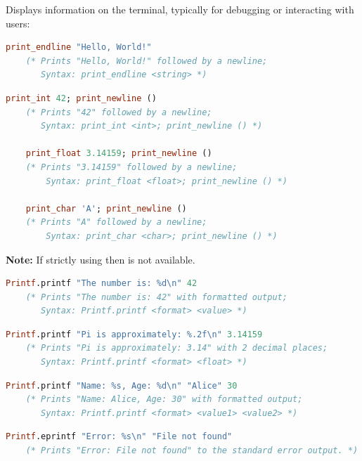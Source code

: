 \newpage
\begin{Def}

    Displays information on the terminal, typically for debugging or interacting with users:
    
    \begin{lstlisting}[language=OCaml, caption={Printing a String}, numbers=none]
    print_endline "Hello, World!"
    (* Prints "Hello, World!" followed by a newline;
       Syntax: print_endline <string> *)
    \end{lstlisting}
    
    \begin{lstlisting}[language=OCaml, caption={Printing Integers, Floats, and Characters}, numbers=none]
    print_int 42; print_newline ()
    (* Prints "42" followed by a newline;
       Syntax: print_int <int>; print_newline () *)
    
    print_float 3.14159; print_newline ()
    (* Prints "3.14159" followed by a newline;
        Syntax: print_float <float>; print_newline () *)

    print_char 'A'; print_newline ()
    (* Prints "A" followed by a newline;
        Syntax: print_char <char>; print_newline () *)
    \end{lstlisting}
    
    \textbf{Note:} If strictly using  then  is not available.
    \begin{lstlisting}[language=OCaml, caption={Formatted Printing with Printf}, numbers=none]
    Printf.printf "The number is: %d\n" 42
    (* Prints "The number is: 42" with formatted output;
       Syntax: Printf.printf <format> <value> *)
    \end{lstlisting}
    
    \begin{lstlisting}[language=OCaml, caption={Formatted Printing for Floats}, numbers=none]
    Printf.printf "Pi is approximately: %.2f\n" 3.14159
    (* Prints "Pi is approximately: 3.14" with 2 decimal places;
       Syntax: Printf.printf <format> <float> *)
    \end{lstlisting}
    
    \begin{lstlisting}[language=OCaml, caption={Printing Multiple Values}, numbers=none]
    Printf.printf "Name: %s, Age: %d\n" "Alice" 30
    (* Prints "Name: Alice, Age: 30" with formatted output;
       Syntax: Printf.printf <format> <value1> <value2> *)
    \end{lstlisting}

    
    \begin{lstlisting}[language=OCaml, caption={Using Printf.eprintf for Error Messages}, numbers=none]
    Printf.eprintf "Error: %s\n" "File not found"
    (* Prints "Error: File not found" to the standard error output. *)
    \end{lstlisting}
    
    \end{Def}

